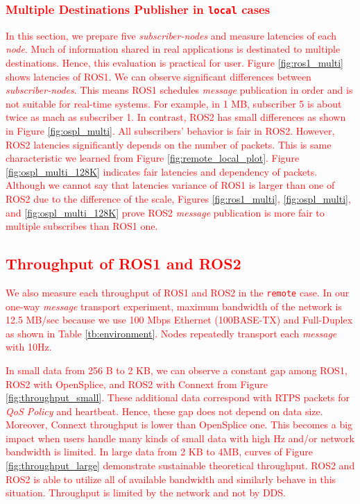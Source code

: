 \documentclass{sig-alternate-05-2015}
\begin{document}
\vspace{-2mm}
\subsubsection{\textcolor{red}{Multiple Destinations Publisher in \texttt{local} cases}}
\label{sec:multiple}
\textcolor{red}{
In this section, we prepare five \emph{subscriber-nodes} and measure latencies of each \emph{node}.
Much of information shared in real applications is destinated to multiple destinations.
Hence, this evaluation is practical for user.
Figure \ref{fig:ros1_multi} shows latencies of ROS1.
We can observe significant differences between \emph{subscriber-nodes}.
This means ROS1 schedules \emph{message} publication in order and is not suitable for real-time systems.
For example, in 1 MB, subscriber 5 is about twice as mach as subscriber 1.
In contrast, ROS2 has small differences as shown in Figure \ref{fig:ospl_multi}.
All subscribers' behavior is fair in ROS2.
However, ROS2 latencies significantly depends on the number of packets.
This is same characteristic we learned from Figure \ref{fig:remote_local_plot}.
Figure \ref{fig:ospl_multi_128K} indicates fair latencies and dependency of packets.
Although we cannot say that latencies variance of ROS1 is larger than one of ROS2 due to the difference of the scale, Figures \ref{fig:ros1_multi}, \ref{fig:ospl_multi}, and \ref{fig:ospl_multi_128K} prove ROS2 \emph{message} publication is more fair to multiple subscribes than ROS1 one.
}

\vspace{-2mm}
\subsection{\textcolor{red}{Throughput of ROS1 and ROS2}}
\label{sec:throughput}
\textcolor{red}{
We also measure each throughput of ROS1 and ROS2 in the \texttt{remote} case.
In our one-way \emph{message} transport experiment, maximum bandwidth of the network is 12.5 MB/sec because we use 100 Mbps Ethernet (100BASE-TX) and Full-Duplex as shown in Table \ref{tb:environment}.
Nodes repeatedly transport each \emph{message} with 10Hz.
}

\textcolor{red}{
In small data from 256 B to 2 KB, we can observe a constant gap among ROS1, ROS2 with OpenSplice, and ROS2 with Connext from Figure \ref{fig:throughput_small}.
These additional data correspond with RTPS packets for \emph{QoS Policy} and heartbeat.
Hence, these gap does not depend on data size.
Moreover, Connext throughput is lower than OpenSplice one.
This becomes a big impact when users handle many kinds of small data with high Hz and/or network bandwidth is limited.
}\textcolor{red}{
In large data from 2 KB to 4MB, curves of Figure \ref{fig:throughput_large} demonstrate sustainable theoretical throughput.
ROS2 and ROS2 is able to utilize all of available bandwidth and similarly behave in this situation.
Throughput is limited by the network and not by DDS.
}
\end{document}
